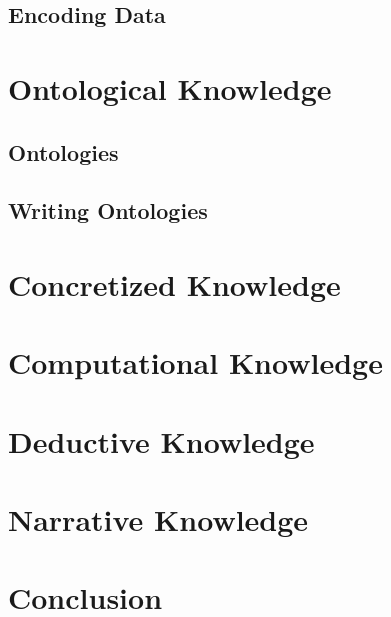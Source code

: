 \documentclass{book}
\begin{document}
\chapter{Encoding Data}\label{sec:wuv:codecs}
  

\part{Ontological Knowledge}\label{sec:wuv:ont}

\chapter{Ontologies}
 

\chapter{Writing Ontologies}
 

\part{Concretized Knowledge}\label{sec:wuv:concr}

\part{Computational Knowledge}\label{sec:wuv:comp}

\part{Deductive Knowledge}\label{sec:wuv:ded}



\part{Narrative Knowledge}\label{sec:wuv:narr}

\part{Conclusion}\label{sec:wuv:conc}

%
%
%
%
%
%


%
\end{document}
